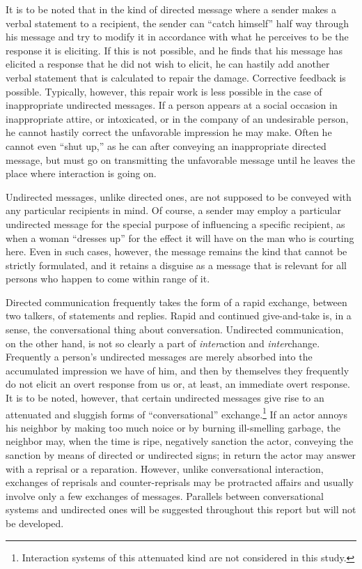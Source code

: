 \documentclass[openany,nobib]{tufte-book}
\begin{document}
It is to be noted that in the kind of directed message where a sender
makes a verbal statement to a recipient, the sender can ``catch
himself'' half way through his message and try to modify it in
accordance with what he perceives to be the response it is eliciting. If
this is not possible, and he finds that his message has elicited a
response that he did not wish to elicit, he can hastily add another
verbal statement that is calculated to repair the damage. Corrective
feedback is possible. Typically, however, this repair work is less
possible in the case of inappropriate undirected messages. If a person
appears at a social occasion in inappropriate attire, or intoxicated, or
in the company of an undesirable person, he cannot hastily correct the
unfavorable impression he may make. Often he cannot even ``shut up,'' as
he can after conveying an inappropriate directed message, but must go on
transmitting the unfavorable message until he leaves the place where
interaction is going on.

Undirected messages, unlike directed ones, are not supposed to be
conveyed with any particular recipients in mind. Of course, a sender may
employ a particular undirected message for the special purpose of
influencing a specific recipient, as when a woman ``dresses up'' for the
effect it will have on the man who is courting here. Even in such cases,
however, the message remains the kind that cannot be strictly
formulated, and it retains a disguise as a message that is relevant for
all persons who happen to come within range of it.

Directed communication frequently takes the form of a rapid exchange,
between two talkers, of statements and replies. Rapid and continued
give-and-take is, in a sense, the conversational thing about
conversation. Undirected communication, on the other hand, is not so
clearly a part of \emph{inter}action and \emph{inter}change. Frequently
a person's undirected messages are merely absorbed into the accumulated
impression we have of him, and then by themselves they frequently do not
elicit an overt response from us or, at least, an immediate overt
response. It is to be noted, however, that certain undirected messages
give rise to an attenuated and sluggish forms of ``conversational''
exchange.\footnote{Interaction systems of this attenuated kind are not
  considered in this study.} If an actor annoys his neighbor by making
too much noice or by burning ill-smelling garbage, the neighbor may,
when the time is ripe, negatively sanction the actor, conveying the
sanction by means of directed or undirected signs; in return the actor
may answer with a reprisal or a reparation. However, unlike
conversational interaction, exchanges of reprisals and counter-reprisals
may be protracted affairs and usually involve only a few exchanges of
messages. Parallels between conversational systems and undirected ones
will be suggested throughout this report but will not be developed.
\end{document}
